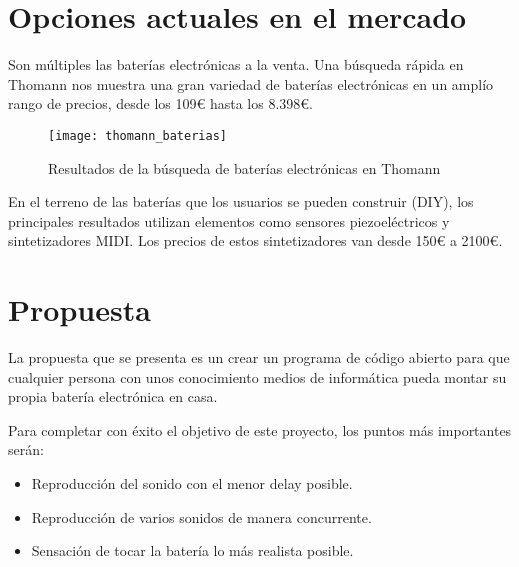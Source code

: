 

    \section{Opciones actuales en el mercado} %
    \label{sec:OpcionesActualesEnElMercado}

        Son múltiples las baterías electrónicas a la venta. Una búsqueda rápida en Thomann \cite{thomann_baterias} nos
        muestra una gran variedad de baterías electrónicas en un amplío rango de precios, desde los 109\euro{} hasta los
        8.398\euro{}.

        \begin{figure}[ht]
            \centering
            \texttt{[image: thomann\_baterias]}
            \caption{Resultados de la búsqueda de baterías electrónicas en Thomann \cite{thomann_baterias}
                     \label{fig:ThomannBusqueda}}
        \end{figure}

        \newpage

        En el terreno de las baterías que los usuarios se pueden construir (DIY), los principales resultados
        \cite{drum_magazine_diy_kit} utilizan elementos como sensores piezoeléctricos y sintetizadores MIDI. Los precios
        de estos sintetizadores van desde 150\euro{} a 2100\euro{}.


    \section{Propuesta} %
    \label{sec:Propuesta}

        La propuesta que se presenta es un crear un programa de código abierto para que cualquier persona con unos
        conocimiento medios de informática pueda montar su propia batería electrónica en casa.

        Para completar con éxito el objetivo de este proyecto, los puntos más importantes serán:

        \begin{itemize}
            \item Reproducción del sonido con el menor delay posible.
            \item Reproducción de varios sonidos de manera concurrente.
            \item Sensación de tocar la batería lo más realista posible.
        \end{itemize}



\newpage
